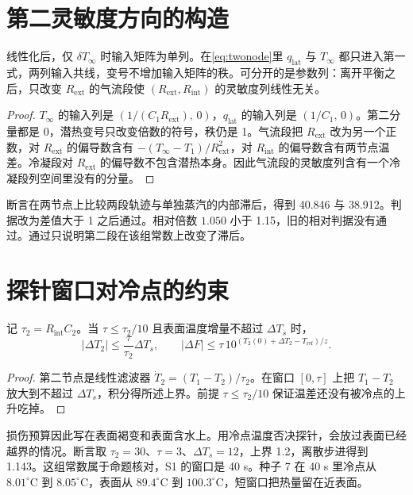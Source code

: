 \section{第二灵敏度方向的构造}

\begin{proposition}[第二输入方向]
\label{prop:pulse}
线性化后，仅 \(\delta T_\infty\) 时输入矩阵为单列。在\eqref{eq:twonode}里 \(q_{\mathrm{lat}}\) 与 \(T_\infty\) 都只进入第一式，两列输入共线，变号不增加输入矩阵的秩。可分开的是参数列：离开平衡之后，只改变 \(R_{\mathrm{ext}}\) 的气流段使 \((R_{\mathrm{ext}},R_{\mathrm{int}})\) 的灵敏度列线性无关。
\end{proposition}

\begin{proof}
\(T_\infty\) 的输入列是 \((1/(C_1 R_{\mathrm{ext}}),\,0)\)，\(q_{\mathrm{lat}}\) 的输入列是 \((1/C_1,\,0)\)。第二分量都是 0，潜热变号只改变倍数的符号，秩仍是 1。气流段把 \(R_{\mathrm{ext}}\) 改为另一个正数，对 \(R_{\mathrm{ext}}\) 的偏导数含有 \(-(T_\infty-T_1)/R_{\mathrm{ext}}^2\)，对 \(R_{\mathrm{int}}\) 的偏导数含有两节点温差。冷凝段对 \(R_{\mathrm{ext}}\) 的偏导数不包含潜热本身。因此气流段的灵敏度列含有一个冷凝段列空间里没有的分量。
\end{proof}

断言在两节点上比较两段轨迹与单独蒸汽的内部滞后，得到 40.846 与 38.912。判据改为差值大于 1 之后通过。相对倍数 \(1.050\) 小于 1.15，旧的相对判据没有通过。通过只说明第二段在该组常数上改变了滞后。

\section{探针窗口对冷点的约束}

\begin{proposition}[冷点增量]
\label{prop:budget}
记 \(\tau_2=R_{\mathrm{int}}C_2\)。当 \(\tau\le\tau_2/10\) 且表面温度增量不超过 \(\Delta T_s\) 时，
\[
|\Delta T_2|\le\frac{\tau}{\tau_2}\Delta T_s,\qquad
|\Delta F|\le\tau\,10^{(T_2(0)+\Delta T_2-T_{\mathrm{ref}})/z}.
\]
\end{proposition}

\begin{proof}
第二节点是线性滤波器 \(\dot T_2=(T_1-T_2)/\tau_2\)。在窗口 \([0,\tau]\) 上把 \(T_1-T_2\) 放大到不超过 \(\Delta T_s\)，积分得所述上界。前提 \(\tau\le\tau_2/10\) 保证温差还没有被冷点的上升吃掉。
\end{proof}

损伤预算因此写在表面褐变和表面含水上。用冷点温度否决探针，会放过表面已经越界的情况。断言取 \(\tau_2=30\)、\(\tau=3\)、\(\Delta T_s=12\)，上界 1.2，离散步进得到 1.143。这组常数属于命题核对，S1 的窗口是 40 s。种子 7 在 40 s 里冷点从 \(8.01^\circ\mathrm{C}\) 到 \(8.05^\circ\mathrm{C}\)，表面从 \(89.4^\circ\mathrm{C}\) 到 \(100.3^\circ\mathrm{C}\)，短窗口把热量留在近表面。

